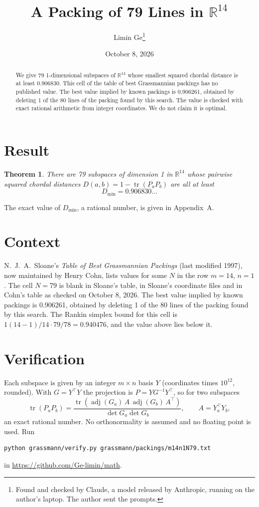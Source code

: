 \documentclass[11pt,a4paper]{article}
\title{A Packing of 79 Lines in $\mathbb{R}^{14}$}
\author{Limin Ge\thanks{Found and checked by Claude, a model released by Anthropic, running on the author's laptop. The author sent the prompts.}}
\date{October 8, 2026}
\newtheorem*{theorem}{Theorem}
\begin{document}
\maketitle
\begin{abstract}
We give 79 1-dimensional subspaces of $\mathbb{R}^{14}$ whose smallest squared chordal distance is at least 0.906830. This cell of the table of best Grassmannian packings has no published value. The best value implied by known packings is 0.906261, obtained by deleting 1 of the 80 lines of the packing found by this search. The value is checked with exact rational arithmetic from integer coordinates. We do not claim it is optimal.
\end{abstract}

\section{Result}
\begin{theorem}
There are 79 subspaces of dimension 1 in $\mathbb{R}^{14}$ whose pairwise squared chordal distances $D(a,b) = 1 - \operatorname{tr}(P_aP_b)$ are all at least
\[ D_{\min} = 0.906830\ldots \]
\end{theorem}
The exact value of $D_{\min}$, a rational number, is given in Appendix~A.


\section{Context}
N.~J.~A.~Sloane's \emph{Table of Best Grassmannian Packings} (last modified 1997), now maintained by Henry Cohn, lists values for some $N$ in the row $m=14$, $n=1$. The cell $N=79$ is blank in Sloane's table, in Sloane's coordinate files and in Cohn's table as checked on October 8, 2026. The best value implied by known packings is 0.906261, obtained by deleting 1 of the 80 lines of the packing found by this search. The Rankin simplex bound for this cell is $1(14-1)/14\cdot 79/78 = 0.940476$, and the value above lies below it.


\section{Verification}
Each subspace is given by an integer $m\times n$ basis $Y$ (coordinates times $10^{12}$, rounded). With $G=Y^\top Y$ the projection is $P=YG^{-1}Y^\top$, so for two subspaces
\[ \operatorname{tr}(P_aP_b)=\frac{\operatorname{tr}(\operatorname{adj}(G_a)\,A\,\operatorname{adj}(G_b)\,A^\top)}{\det G_a\det G_b},\qquad A=Y_a^\top Y_b, \]
an exact rational number. No orthonormality is assumed and no floating point is used. Run
\begin{verbatim}
python grassmann/verify.py grassmann/packings/m14n1N79.txt
\end{verbatim}
in \url{https://github.com/Ge-limin/math}.
\end{document}
